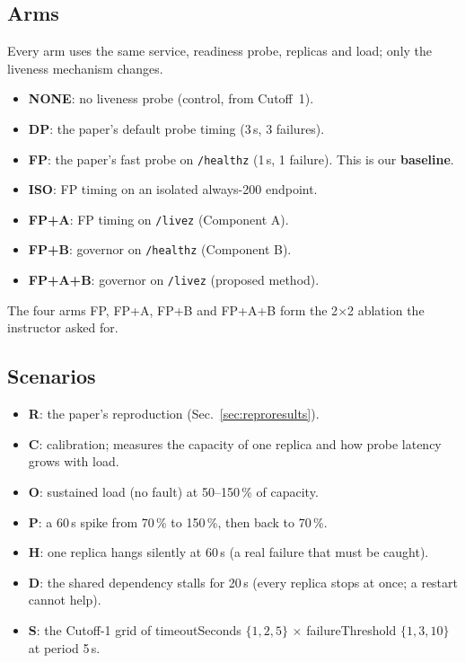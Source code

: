\documentclass[conference]{IEEEtran}
\newcommand{\FPA}{FP+A}
\newcommand{\FPB}{FP+B}
\newcommand{\FPAB}{FP+A+B}
\begin{document}
\subsection{Arms}
Every arm uses the same service, readiness probe, replicas and load;
only the liveness mechanism changes.
\begin{itemize}
\item \textbf{NONE}: no liveness probe (control, from Cutoff~1).
\item \textbf{DP}: the paper's default probe timing (3\,s, 3 failures).
\item \textbf{FP}: the paper's fast probe on \texttt{/healthz}
  (1\,s, 1 failure). This is our \textbf{baseline}.
\item \textbf{ISO}: FP timing on an isolated always-200 endpoint.
\item \textbf{\FPA}: FP timing on \texttt{/livez} (Component A).
\item \textbf{\FPB}: governor on \texttt{/healthz} (Component B).
\item \textbf{\FPAB}: governor on \texttt{/livez} (proposed method).
\end{itemize}
The four arms FP, \FPA, \FPB{} and \FPAB{} form the 2$\times$2 ablation
the instructor asked for.

\subsection{Scenarios}
\begin{itemize}
\item \textbf{R}: the paper's reproduction (Sec.~\ref{sec:reproresults}).
\item \textbf{C}: calibration; measures the capacity of one replica and
  how probe latency grows with load.
\item \textbf{O}: sustained load (no fault) at 50--150\,\% of capacity.
\item \textbf{P}: a 60\,s spike from 70\,\% to 150\,\%, then back to
  70\,\%.
\item \textbf{H}: one replica hangs silently at 60\,s (a real failure
  that must be caught).
\item \textbf{D}: the shared dependency stalls for 20\,s (every replica
  stops at once; a restart cannot help).
\item \textbf{S}: the Cutoff-1 grid of timeoutSeconds $\{1,2,5\}$
  $\times$ failureThreshold $\{1,3,10\}$ at period 5\,s.
\end{itemize}
\end{document}
